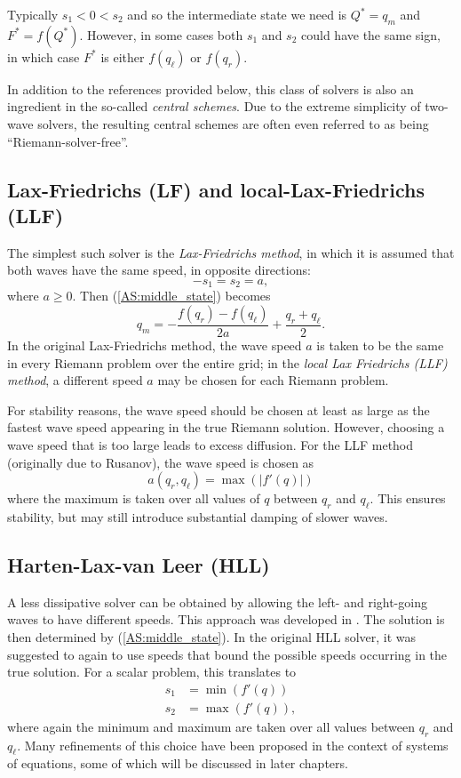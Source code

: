 \documentclass{SIAMbook2016}
\begin{document}
Typically \(s_1 < 0 < s_2\) and so the intermediate state we need is
\(Q^* = q_m\) and \(F^* = f(Q^*)\). However, in some cases both \(s_1\)
and \(s_2\) could have the same sign, in which case \(F^*\) is either
\(f(q_\ell)\) or \(f(q_r)\).

In addition to the references provided below, this class of solvers is
also an ingredient in the so-called \emph{central schemes}. Due to the
extreme simplicity of two-wave solvers, the resulting central schemes
are often even referred to as being ``Riemann-solver-free''.

\hypertarget{lax-friedrichs-lf-and-local-lax-friedrichs-llf}{%
\subsection{Lax-Friedrichs (LF) and local-Lax-Friedrichs
(LLF)}\label{lax-friedrichs-lf-and-local-lax-friedrichs-llf}}

The simplest such solver is the \emph{Lax-Friedrichs method}, in which
it is assumed that both waves have the same speed, in opposite
directions: \[-s_1 = s_2 = a,\] where \(a\ge 0\). Then
(\ref{AS:middle_state}) becomes
\[q_m = -\frac{f(q_r) - f(q_\ell)}{2a} + \frac{q_r + q_\ell}{2}.\] In
the original Lax-Friedrichs method, the wave speed \(a\) is taken to be
the same in every Riemann problem over the entire grid; in the
\emph{local Lax Friedrichs (LLF) method}, a different speed \(a\) may be
chosen for each Riemann problem.

For stability reasons, the wave speed should be chosen at least as large
as the fastest wave speed appearing in the true Riemann solution.
However, choosing a wave speed that is too large leads to excess
diffusion. For the LLF method (originally due to Rusanov), the wave
speed is chosen as 
\[a(q_r, q_\ell) = \max(|f'(q)|)\]
where the maximum is taken over all values of \(q\) between \(q_r\) and
\(q_\ell\). This ensures stability, but may still introduce substantial
damping of slower waves.

\hypertarget{harten-lax-van-leer-hll}{%
\subsection{Harten-Lax-van Leer (HLL)}\label{harten-lax-van-leer-hll}}

A less dissipative solver can be obtained by allowing the left- and
right-going waves to have different speeds. This approach was developed
in \cite{HLL}. The solution is then determined by
(\ref{AS:middle_state}). In the original HLL solver, it was suggested to
again to use speeds that bound the possible speeds occurring in the true
solution. For a scalar problem, this translates to
\begin{align*}
s_1 & = \min(f'(q)) \\
s_2 & = \max(f'(q)),
\end{align*}
where again the minimum and maximum are taken over all values between
\(q_r\) and \(q_\ell\). Many refinements of this choice have been
proposed in the context of systems of equations, some of which will be
discussed in later chapters.
\end{document}
